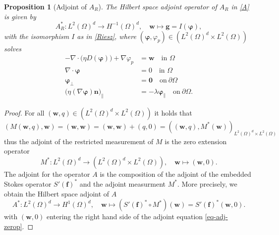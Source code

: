 \documentclass[final,leqno]{scrarticle}
\newtheorem{proposition}[theorem]{Proposition}
\newcommand{\lzo}{L^2(\Omega)}
\newcommand{\Hd}{{H^1(\Omega)^d}}
\newcommand{\lzd}{{L^2(\Omega)^d}}
\begin{document}
\begin{proposition}[Adjoint of $A_R$]\label{prop:adj-Robin}
    The Hilbert space adjoint operator of $A_R$ in \eqref{A} is given by
    \begin{displaymath}
        A_R^*:\lzd \rightarrow H^{-1}(\Omega)^d, \quad \mathbf{w} \mapsto \mathbf{g} = I(\boldsymbol{\varphi}),
    \end{displaymath} with the isomorphism $I$ as in \eqref{Riesz}, where $(\boldsymbol{\varphi},\varphi_p) \in (\lzd\times\lzo)$ solves 
          \begin{equation}\label{eq-adj-zerop} 
 \begin{split}
  -\nabla \cdot \big( \eta D(\boldsymbol{\varphi}) \big) + \nabla \varphi_p &= \mathbf{w} \quad \text{in } \Omega\\
  \nabla \cdot \boldsymbol{\varphi} &= 0 \quad \text{in } \Omega\\
  \boldsymbol{\varphi}_{\bot} &= \mathbf{0} \quad \text{on} \ \partial\Omega \\
  \big(\eta (\nabla \boldsymbol{\varphi})\mathbf{n} \big)_{\parallel} &= -\lambda \boldsymbol{\varphi}_{\parallel}\quad \text{on} \ \partial\Omega.
 \end{split}
\end{equation}

\end{proposition}

\begin{proof}
For all $(\mathbf{w},q)\in (\lzd \times \lzo ) $ it holds that
\begin{displaymath}
        (M(\mathbf{w},q),\mathbf{w}) = (\mathbf{w},\mathbf{w})  
    = (\mathbf{w},\mathbf{w}) + (q,0)  
    = ((\mathbf{w},q),M^{*}(\mathbf{w}))_{\lzd\times\lzo}
    \end{displaymath}
thus the adjoint of the restricted measurement of $M$ is the zero extension operator
    \begin{displaymath}
    M^* : \lzd \rightarrow (\lzd \times \lzo ) , \quad \mathbf{w} \mapsto (\mathbf{w},0).
\end{displaymath}
The adjoint for the operator $A$ is the composition of the adjoint of the embedded Stokes operator $S'(\mathbf{f})^*$ and the adjoint measurment $M^*$. More precisely, we obtain the Hilbert space adjoint of $A$ 
\begin{displaymath}
    A^*: \lzd \rightarrow \Hd  , \quad \mathbf{w} \mapsto (S'(\mathbf{f})^* \circ M^*) (\mathbf{w}) =  S'(\mathbf{f})^*(\mathbf{w},0).
\end{displaymath}
with $(\mathbf{w},0)$ entering the right hand side of the adjoint equation \eqref{eq-adj-zerop}.
\end{proof}
\end{document}
